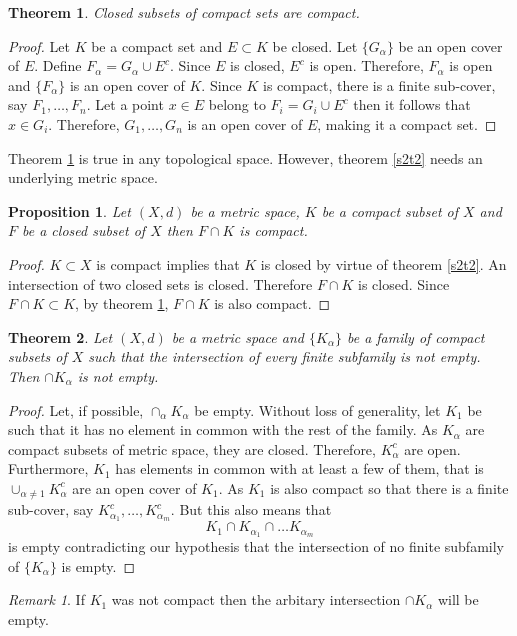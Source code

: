 \documentclass{article}
\theoremstyle{plain}
\newtheorem{thm}{Theorem}
\numberwithin{thm}{section}
\theoremstyle{plain}
\newtheorem{prop}{Proposition}
\numberwithin{prop}{section}
\theoremstyle{definition}
\numberwithin{defn}{section}
\theoremstyle{remark}
\newtheorem*{rem}{Remark}
\numberwithin{equation}{section}
\begin{document}
\begin{thm}\label{s2t3}
Closed subsets of compact sets are compact.
\end{thm}
\begin{proof}
Let $K$ be a compact set and $E \subset K$ be closed. Let $\{G_\alpha\}$ be
an open cover of $E$. Define $F_\alpha = G_\alpha \cup E^c$. Since $E$ is 
closed, $E^c$ is open. Therefore, $F_\alpha$ is open and $\{F_\alpha\}$ is an
open cover of $K$. Since $K$ is compact, there is a finite sub-cover, say $
F_1, \ldots, F_n$. Let a point $x \in E$ belong to $F_i = G_i \cup E^c$ then it
follows that $x \in G_i$. Therefore, $G_1, \ldots, G_n$ is an open cover of $E$,
making it a compact set.
\end{proof}

Theorem \ref{s2t3} is true in any topological space. However, theorem \ref{s2t2}
needs an underlying metric space.

\begin{prop}\label{s2p1}
Let $(X, d)$ be a metric space, $K$ be a compact subset of $X$ and $F$ be a 
closed subset of $X$ then $F \cap K$ is compact.
\end{prop}
\begin{proof}
$K \subset X$ is compact implies that $K$ is closed by virtue of theorem 
\ref{s2t2}. An intersection of two closed sets is closed. Therefore $F \cap K$
is closed. Since $F \cap K \subset K$, by theorem \ref{s2t3}, $F \cap K$ is
also compact.
\end{proof}

\begin{thm}\label{s2t4}
Let $(X, d)$ be a metric space and $\{K_\alpha\}$ be a family of compact subsets
of $X$ such that the intersection of every finite subfamily is not empty. Then
$\cap K_\alpha$ is not empty.
\end{thm}
\begin{proof}
Let, if possible, $\cap_\alpha K_\alpha$ be empty. Without loss of generality,
let $K_1$ be such that it has no element in common with the rest of the family.
As $K_\alpha$ are compact subsets of metric space, they are closed. Therefore,
$K_\alpha^c$ are open. Furthermore, $K_1$ has elements in common with at least
a few of them, that is $\cup_{\alpha \ne 1} K_\alpha^c$ are an open cover of
$K_1$. As $K_1$ is also compact so that there is a finite sub-cover, say 
$K_{\alpha_1}^c, \ldots, K_{\alpha_m}^c$. But this also means that
\[
K_1 \cap K_{\alpha_1} \cap \ldots K_{\alpha_m}
\]
is empty contradicting our hypothesis that the intersection of no finite 
subfamily of $\{K_\alpha\}$ is empty.
\end{proof}
\begin{rem}
If $K_1$ was not compact then the arbitary intersection $\cap K_\alpha$ will
be empty.
\end{rem}
\end{document}
